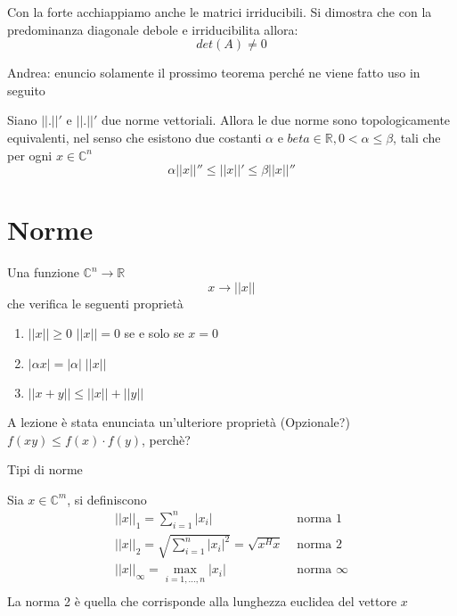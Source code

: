 Con la forte acchiappiamo anche le matrici irriducibili.
Si dimostra che con la predominanza diagonale debole e irriducibilita
allora:
 $$det(A) \neq 0 $$

\begin{notes}
 Andrea: enuncio solamente il prossimo teorema perch\'e ne viene
fatto uso in seguito
\end{notes}

\begin{theo}
\label{norme:equivalenzanorme}
Siano $||.||'$ e $||.||'$ due norme vettoriali. Allora le due norme
sono topologicamente equivalenti, nel senso che esistono due costanti
$\alpha$ e $beta \in \mathbb{R}, 0 < \alpha \leq \beta$, tali che per ogni
$x \in \mathbb{C}^{n}$
$$ \alpha ||x||'' \leq ||x||' \leq \beta||x||''$$
\end{theo}




\section{Norme}

\begin{defn}[Norma]
Una funzione $\mathbb{C}^{n} \rightarrow \mathbb{R}$
$$ x \rightarrow ||x||$$
che verifica le seguenti propriet\`a
\begin{enumerate}
 \item $||x|| \geq 0$ \qquad $||x||  = 0 $ se e solo se $x=0$
 \item $|\alpha x| = |\alpha| \; ||x||$
 \item $||x+y|| \leq ||x|| + ||y||$ 
\end{enumerate}
\begin{notes}
A lezione \`e stata enunciata un'ulteriore propriet\`a
  (Opzionale?) $f(xy) \leq f(x)\cdot f(y) $,
 perch\`e? 
\end{notes}
\end{defn}

Tipi di norme
\begin{defn}
Sia $x \in \mathbb{C}^{m}$, si definiscono
$$
\begin{array}{ll}
   || x ||_{1} =  \displaystyle \sum_{i=1}^{n}|x_i| & \text{ norma  } 1 \\
   || x ||_{2} = \sqrt{\displaystyle \sum_{i=1}^n |x_i|^2} = \sqrt{x^{H}x}
  & \text{ norma  } 2 \\
   || x ||_{\infty} =  \displaystyle \max_{i=1, \ldots, n}|x_i|
      & \text{ norma  } \infty \\
\end{array}
$$
La norma 2 \`e quella che corrisponde alla lunghezza euclidea del vettore $x$
\end{defn}

